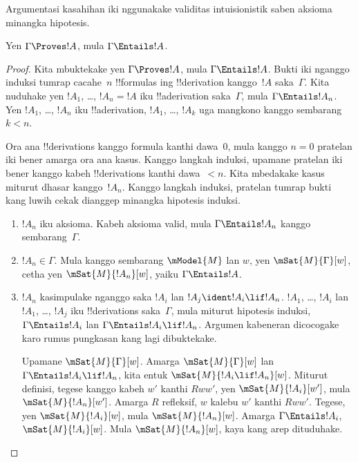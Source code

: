 \documentclass[../../../include/open-logic-section]{subfiles}
\begin{document}


\begin{editorial}
Argumentasi kasahihan iki nggunakake validitas intuisionistik saben aksioma minangka hipotesis.
\end{editorial}

\begin{thm}
  Yen $\Gamma \Proves !A$, mula $ \Gamma \Entails !A$.
\end{thm}

\begin{proof}
  Kita mbuktekake yen $\Gamma \Proves !A$, mula $\Gamma \Entails !A$.
  Bukti iki nganggo induksi tumrap cacahe~$n$ !!{formula}s ing
  !!{derivation} kanggo~$!A$ saka~$\Gamma$. Kita nuduhake yen $!A_1$,
  \dots, $!A_n = !A$ iku !!a{derivation} saka~$\Gamma$, mula $\Gamma
  \Entails !A_n$. Yen $!A_1$, \dots, $!A_n$ iku !!a{derivation},
  $!A_1$, \dots, $!A_k$ uga mangkono kanggo sembarang $k<n$.

  Ora ana !!{derivation}s kanggo formula kanthi dawa~$0$, mula
  kanggo $n=0$ pratelan iki bener amarga ora ana kasus. Kanggo langkah
  induksi, upamane pratelan iki bener kanggo kabeh !!{derivation}s
  kanthi dawa~$<n$. Kita mbedakake kasus miturut dhasar kanggo~$!A_n$.
Kanggo langkah induksi, pratelan tumrap bukti kang luwih cekak dianggep minangka hipotesis induksi.
  
  \begin{enumerate}
  \item $!A_n$ iku aksioma. Kabeh aksioma valid, mula $\Gamma \Entails
    !A_n$ kanggo sembarang~$\Gamma$.
  \item $!A_n \in \Gamma$. Mula kanggo sembarang $\mModel{M}$ lan $w$,
    yen $\mSat{M}{\Gamma}[w]$, cetha yen $\mSat{M}{!A_n}[w]$,
    yaiku $\Gamma \Entails !A$.
  \item $!A_n$ kasimpulake nganggo \MP{} saka $!A_i$ lan
    $!A_j \ident !A_i \lif !A_n$. $!A_1$, \dots, $!A_i$ lan $!A_1$,
    \dots, $!A_j$ iku !!{derivation}s saka~$\Gamma$, mula miturut
    hipotesis induksi, $\Gamma \Entails !A_i$ lan
    $\Gamma \Entails !A_i \lif !A_n$.
Argumen kabeneran dicocogake karo rumus pungkasan kang lagi dibuktekake.
    
    Upamane $\mSat{M}{\Gamma}[w]$. Amarga $\mSat{M}{\Gamma}[w]$ lan
    $\Gamma \Entails !A_i \lif !A_n$, kita entuk
    $\mSat{M}{!A_i \lif !A_n}[w]$. Miturut definisi, tegese kanggo
    kabeh $w'$ kanthi $Rww'$, yen $\mSat{M}{!A_i}[w']$, mula
    $\mSat{M}{!A_n}[w']$. Amarga $R$ refleksif, $w$ kalebu $w'$
    kanthi $Rww'$. Tegese, yen $\mSat{M}{!A_i}[w]$, mula
    $\mSat{M}{!A_n}[w]$. Amarga $\Gamma \Entails !A_i$,
    $\mSat{M}{!A_i}[w]$. Mula $\mSat{M}{!A_n}[w]$, kaya kang arep dituduhake.
  \end{enumerate}
\end{proof}
\end{document}
